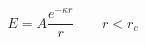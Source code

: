 \documentclass[12pt]{article}
\begin{document}
$$
   E = A \frac{e^{- \kappa r}}{r} \qquad r < r_c
$$
\end{document}
